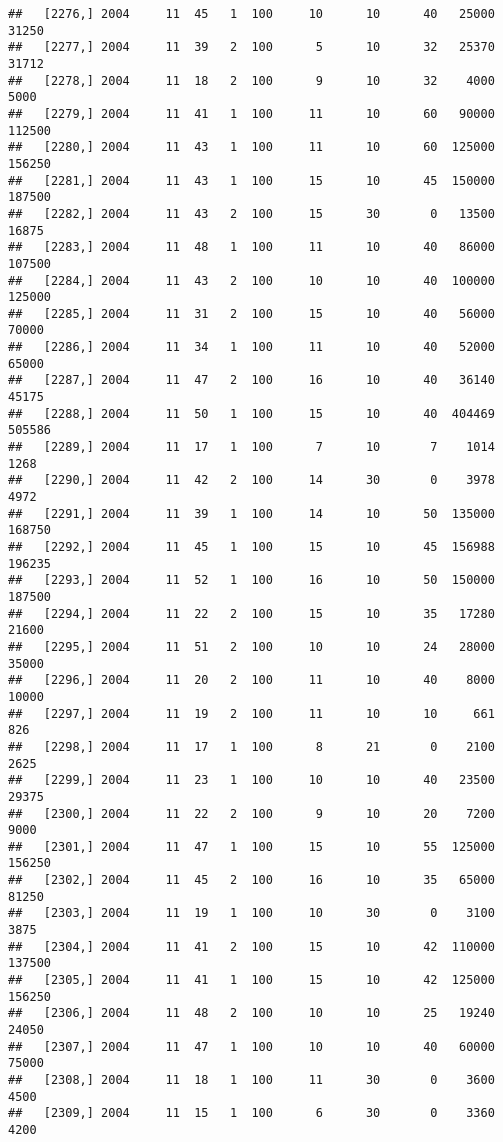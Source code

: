 \documentclass{article}\usepackage[]{graphicx}\usepackage[]{color}
\makeatletter
\newenvironment{kframe}{%
 \def\at@end@of@kframe{}%
 \ifinner\ifhmode%
  \def\at@end@of@kframe{\end{minipage}}%
  \begin{minipage}{\columnwidth}%
 \fi\fi%
 \def\FrameCommand##1{\hskip\@totalleftmargin \hskip-\fboxsep
 \colorbox{shadecolor}{##1}\hskip-\fboxsep
     \hskip-\linewidth \hskip-\@totalleftmargin \hskip\columnwidth}%
 \MakeFramed {\advance\hsize-\width
   \@totalleftmargin\z@ \linewidth\hsize
   \@setminipage}}%
 {\par\unskip\endMakeFramed%
 \at@end@of@kframe}
\newenvironment{knitrout}{}{} %
\makeatother
\begin{document}
\begin{knitrout}
\begin{kframe}
\begin{verbatim}
##   [2276,] 2004     11  45   1  100     10      10      40   25000   31250
##   [2277,] 2004     11  39   2  100      5      10      32   25370   31712
##   [2278,] 2004     11  18   2  100      9      10      32    4000    5000
##   [2279,] 2004     11  41   1  100     11      10      60   90000  112500
##   [2280,] 2004     11  43   1  100     11      10      60  125000  156250
##   [2281,] 2004     11  43   1  100     15      10      45  150000  187500
##   [2282,] 2004     11  43   2  100     15      30       0   13500   16875
##   [2283,] 2004     11  48   1  100     11      10      40   86000  107500
##   [2284,] 2004     11  43   2  100     10      10      40  100000  125000
##   [2285,] 2004     11  31   2  100     15      10      40   56000   70000
##   [2286,] 2004     11  34   1  100     11      10      40   52000   65000
##   [2287,] 2004     11  47   2  100     16      10      40   36140   45175
##   [2288,] 2004     11  50   1  100     15      10      40  404469  505586
##   [2289,] 2004     11  17   1  100      7      10       7    1014    1268
##   [2290,] 2004     11  42   2  100     14      30       0    3978    4972
##   [2291,] 2004     11  39   1  100     14      10      50  135000  168750
##   [2292,] 2004     11  45   1  100     15      10      45  156988  196235
##   [2293,] 2004     11  52   1  100     16      10      50  150000  187500
##   [2294,] 2004     11  22   2  100     15      10      35   17280   21600
##   [2295,] 2004     11  51   2  100     10      10      24   28000   35000
##   [2296,] 2004     11  20   2  100     11      10      40    8000   10000
##   [2297,] 2004     11  19   2  100     11      10      10     661     826
##   [2298,] 2004     11  17   1  100      8      21       0    2100    2625
##   [2299,] 2004     11  23   1  100     10      10      40   23500   29375
##   [2300,] 2004     11  22   2  100      9      10      20    7200    9000
##   [2301,] 2004     11  47   1  100     15      10      55  125000  156250
##   [2302,] 2004     11  45   2  100     16      10      35   65000   81250
##   [2303,] 2004     11  19   1  100     10      30       0    3100    3875
##   [2304,] 2004     11  41   2  100     15      10      42  110000  137500
##   [2305,] 2004     11  41   1  100     15      10      42  125000  156250
##   [2306,] 2004     11  48   2  100     10      10      25   19240   24050
##   [2307,] 2004     11  47   1  100     10      10      40   60000   75000
##   [2308,] 2004     11  18   1  100     11      30       0    3600    4500
##   [2309,] 2004     11  15   1  100      6      30       0    3360    4200

\end{verbatim}
\end{kframe}
\end{knitrout}
\end{document}
